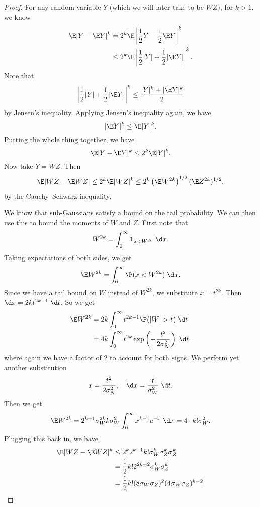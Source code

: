 \documentclass[a4paper]{article}
\begin{document}
\begin{proof}
  For any random variable $Y$ (which we will later take to be $WZ$), for $k > 1$, we know
  \begin{align*}
    \E |Y - \E Y|^k &= 2^k \E \left| \frac{1}{2}Y - \frac{1}{2}\E Y\right|^k\\
    &\leq 2^k \E \left| \frac{1}{2} |Y| + \frac{1}{2} |\E Y|\right|^k.
  \end{align*}
  Note that
  \[
    \left| \frac{1}{2} |Y| + \frac{1}{2} |\E Y|\right|^k \leq \frac{|Y|^k + |\E Y|^k}{2}
  \]
  by Jensen's inequality. Applying Jensen's inequality again, we have
  \[
    |\E Y|^k \leq \E |Y|^k.
  \]
  Putting the whole thing together, we have
  \[
    \E |Y - \E Y|^k \leq 2^k \E |Y|^k.
  \]
  Now take $Y = WZ$. Then
  \[
    \E |WZ - \E WZ| \leq 2^k \E |WZ|^k \leq 2^k \left(\E W^{2k}\right)^{1/2} (\E Z^{2k})^{1/2},
  \]
  by the Cauchy--Schwarz inequality.

  We know that sub-Gaussians satisfy a bound on the tail probability. We can then use this to bound the moments of $W$ and $Z$. First note that
  \[
    W^{2k} = \int_0^\infty \mathbf{1}_{x < W^{2k}} \;\d x.
  \]
  Taking expectations of both sides, we get
  \[
    \E W^{2k} = \int_0^\infty \P(x < W^{2k})\;\d x.
  \]
  Since we have a tail bound on $W$ instead of $W^{2k}$, we substitute $x = t^{2k}$. Then $\d x = 2k t^{2k - 1}\;\d t$. So we get
  \begin{align*}
    \E W^{2k} &= 2k \int_0^\infty t^{2k - 1} \P(|W| > t) \;\d t\\
    &= 4k \int_0^\infty t^{2k} \exp \left(-\frac{t^2}{2 \sigma_N^2}\right)\;\d t.
  \end{align*}
  where again we have a factor of $2$ to account for both signs. We perform yet another substitution
  \[
    x = \frac{t^2}{2 \sigma_N^2},\quad \d x = \frac{t}{\sigma_W^2}\;\d t.
  \]
  Then we get
  \[
    \E W^{2k} = 2^{k + 1} \sigma_W^{2k} k \sigma_W^2 \int_0^\infty x^{k - 1} e^{-x}\;\d x = 4 \cdot k! \sigma_W^2.
  \]
  Plugging this back in, we have
  \begin{align*}
    \E|WZ - \E WZ|^k &\leq 2^k 2^{k + 1} k! \sigma_W^k \sigma_Z^k \sigma_Z^k\\
    &= \frac{1}{2} k! 2^{2k + 2} \sigma_W^k \sigma_Z^k\\
    &= \frac{1}{2} k! (8 \sigma_W \sigma_Z)^2 (4 \sigma_W \sigma_Z)^{k - 2}.\qedhere
  \end{align*}
\end{proof}
\end{document}
